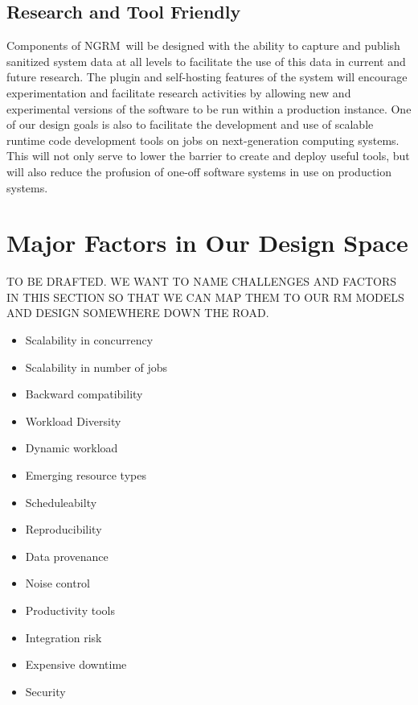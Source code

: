 \documentclass{article}
\newcommand{\ngrm}{NGRM}
\begin{document}
\subsection{Research and Tool Friendly}

Components of \ngrm\ will be designed with the ability to capture and
publish sanitized system data at all levels to facilitate the use of
this data in current and future research.  The plugin and self-hosting
features of the system will encourage experimentation and
facilitate research activities by allowing new and experimental
versions of the software to be run within a production instance.
One of our design goals is also to facilitate the
development and use of scalable runtime code development tools 
on jobs on next-generation computing systems. This will not only serve 
to lower the barrier to create and deploy useful tools, but will also reduce the
profusion of one-off software systems in use on production systems.


\section{Major Factors in Our Design Space}

TO BE DRAFTED. WE WANT TO NAME CHALLENGES AND FACTORS IN THIS SECTION SO THAT WE CAN MAP THEM TO OUR RM MODELS AND DESIGN SOMEWHERE DOWN THE ROAD. 

\begin{itemize}
\item{Scalability in concurrency} 
\item{Scalability in number of jobs} 
\item{Backward compatibility} 
\item{Workload Diversity}
\item{Dynamic workload}
\item{Emerging resource types}  
\item{Scheduleabilty}  
\item{Reproducibility}
\item{Data provenance}
\item{Noise control}
\item{Productivity tools}  
\item{Integration risk}
\item{Expensive downtime}
\item{Security}
\end{itemize}


%
%
 
\end{document}
